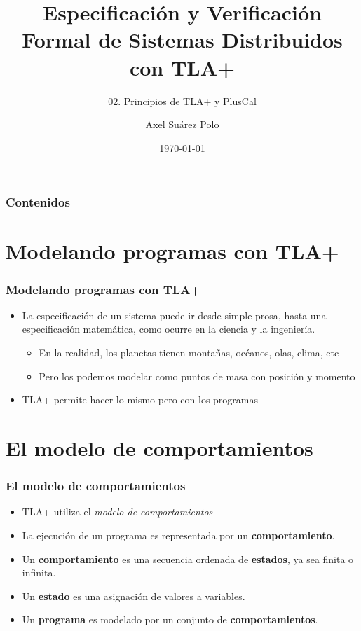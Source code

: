 \documentclass{beamer}
\title{Especificación y Verificación Formal de Sistemas Distribuidos con TLA+}
\subtitle{02. Principios de TLA+ y PlusCal}
\author{Axel Suárez Polo}
\institute{BUAP}
\date{\today}
\begin{document}
\begin{frame}
  \titlepage
\end{frame}

\begin{frame}[t]
  \frametitle{Contenidos}
  \tableofcontents
\end{frame}

\section{Modelando programas con TLA+}

\begin{frame}
  \frametitle{Modelando programas con TLA+}

  \begin{itemize}
    \item La especificación de un sistema puede ir desde simple prosa, hasta
          una especificación matemática, como ocurre en la ciencia y la ingeniería.
          \begin{itemize}
            \item En la realidad, los planetas tienen montañas, océanos, olas, clima, etc
            \item Pero los podemos modelar como puntos de masa con posición y momento
          \end{itemize}
    \item TLA+ permite hacer lo mismo pero con los programas
  \end{itemize}
\end{frame}

\section{El modelo de comportamientos}

\begin{frame}
  \frametitle{El modelo de comportamientos}

  \begin{itemize}
    \item TLA+ utiliza el \emph{modelo de comportamientos}
    \item La ejecución de un programa es representada por un \textbf{comportamiento}.
    \item Un \textbf{comportamiento} es una secuencia ordenada de \textbf{estados}, ya sea finita o infinita.
    \item Un \textbf{estado} es una asignación de valores a variables.

    \item Un \textbf{programa} es modelado por un conjunto de \textbf{comportamientos}.
  \end{itemize}
\end{frame}
\end{document}
